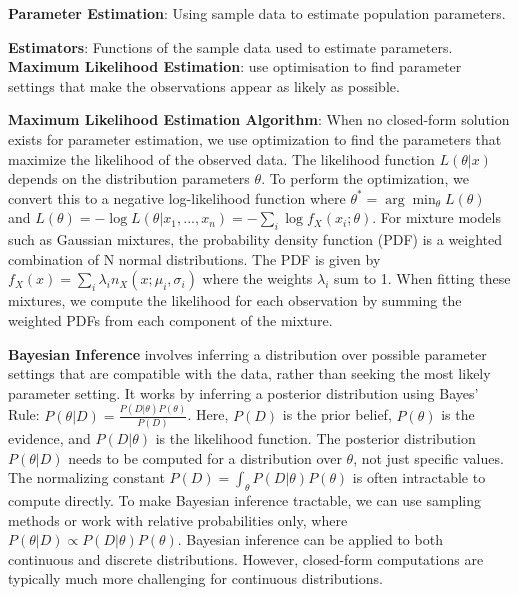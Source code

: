 \documentclass{article}
\begin{document}

\noindent \textbf{Parameter Estimation}: Using sample data to estimate population parameters.


\noindent \textbf{Estimators}: Functions of the sample data used to estimate parameters.
\textbf{Maximum Likelihood Estimation}: use optimisation to find parameter settings that make the observations appear as likely as possible.


\noindent \textbf{Maximum Likelihood Estimation Algorithm}:
When no closed-form solution exists for parameter estimation, we use optimization to find the parameters that maximize the likelihood of the observed data.
The likelihood function $L(\theta|x)$ depends on the distribution parameters $\theta$.
To perform the optimization, we convert this to a negative log-likelihood function where $\theta^* = \arg \min_\theta L(\theta)$ and $L(\theta) = -\log L(\theta|x_1,...,x_n) = -\sum_i \log f_X(x_i;\theta)$.
For mixture models such as Gaussian mixtures, the probability density function (PDF) is a weighted combination of N normal distributions.
The PDF is given by $f_X(x) = \sum_i \lambda_i n_X(x;\mu_i,\sigma_i)$ where the weights $\lambda_i$ sum to 1.
When fitting these mixtures, we compute the likelihood for each observation by summing the weighted PDFs from each component of the mixture.



\noindent \textbf{Bayesian Inference} involves inferring a distribution over possible parameter settings that are compatible with the data, rather than seeking the most likely parameter setting.
It works by inferring a posterior distribution using Bayes' Rule: $P(\theta|D) = \frac{P(D|\theta)P(\theta)}{P(D)}$.
Here, $P(D)$ is the prior belief, $P(\theta)$ is the evidence, and $P(D|\theta)$ is the likelihood function.
The posterior distribution $P(\theta|D)$ needs to be computed for a distribution over $\theta$, not just specific values.
The normalizing constant $P(D) = \int_\theta P(D|\theta)P(\theta)$ is often intractable to compute directly.
To make Bayesian inference tractable, we can use sampling methods or work with relative probabilities only, where $P(\theta|D) \propto P(D|\theta)P(\theta)$.
Bayesian inference can be applied to both continuous and discrete distributions.
However, closed-form computations are typically much more challenging for continuous distributions.
\end{document}

